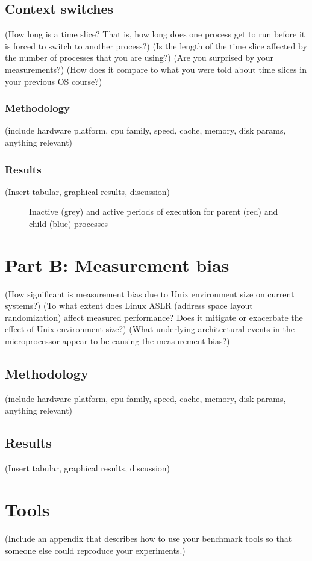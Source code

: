 \documentclass{article}
\begin{document}
\subsection{Context switches}
(How long is a time slice? That is, how long does one process get to run before it is forced to switch to another process?)
(Is the length of the time slice affected by the number of processes that you are using?)
(Are you surprised by your measurements?)
(How does it compare to what you were told about time slices in your previous OS course?)
\subsubsection{Methodology}
(include hardware platform, cpu family, speed, cache, memory, disk params, anything relevant)
\subsubsection{Results}
(Insert tabular, graphical results, discussion)
\begin{figure}[h]
    \caption{Inactive (grey) and active periods of execution for parent (red)
    and child (blue) processes}
    
\end{figure}

\newpage
\section{Part B: Measurement bias}
\label{sec:B}
(How significant is measurement bias due to Unix environment size on current systems?)
(To what extent does Linux ASLR (address space layout randomization) affect measured performance? Does it mitigate or exacerbate the effect of Unix environment size?)
(What underlying architectural events in the microprocessor appear to be causing the measurement bias?)
\subsection{Methodology}
(include hardware platform, cpu family, speed, cache, memory, disk params, anything relevant)
\subsection{Results}
(Insert tabular, graphical results, discussion)

\newpage
\appendix
\section{Tools}
(Include an appendix that describes how to use your benchmark tools so that someone else could reproduce your experiments.)
\end{document}
